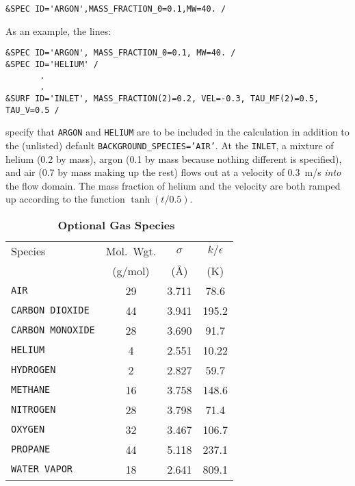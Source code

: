 \documentclass[11pt]{book}
\newcommand{\ct}{\tt\small}
\begin{document}
\footnotesize
\begin{verbatim}
&SPEC ID='ARGON',MASS_FRACTION_0=0.1,MW=40. /
\end{verbatim}
\normalsize



As an example, the lines:

\footnotesize
\begin{verbatim}
&SPEC ID='ARGON', MASS_FRACTION_0=0.1, MW=40. /
&SPEC ID='HELIUM' /
       .
       .
&SURF ID='INLET', MASS_FRACTION(2)=0.2, VEL=-0.3, TAU_MF(2)=0.5, TAU_V=0.5 /
\end{verbatim}
\normalsize
specify that {\ct ARGON} and {\ct HELIUM} are to be included in the calculation
in addition to the (unlisted) default
{\ct BACKGROUND\_SPECIES='AIR'}. At
the {\ct INLET}, a mixture of helium (0.2 by mass), argon (0.1 by mass
because nothing different is specified), and air (0.7 by mass making
up the rest) flows out at a velocity of 0.3~m/s {\em into} the flow
domain. The mass fraction of helium and the velocity are both
ramped up according to the function $\tanh(t/0.5)$.


\begin{table}[t]
\begin{center}
\caption{\bf Optional Gas Species~\cite{Reid:1}}
\label{tab:gasspecies}
\vspace{0.1in}
\begin{tabular}{|l|c|c|c|}
\hline
Species &   Mol.~Wgt.        & $\sigma$  & $k/\epsilon$  \\
        &   (g/mol)          & (\AA)     & (K)            \\ \hline
\hline
{\ct AIR}             & 29   & 3.711     & 78.6           \\ \hline
{\ct CARBON DIOXIDE}  & 44   & 3.941     &195.2           \\ \hline
{\ct CARBON MONOXIDE} & 28   & 3.690     & 91.7           \\ \hline
{\ct HELIUM}          &  4   & 2.551     & 10.22          \\ \hline
{\ct HYDROGEN}        &  2   & 2.827     & 59.7           \\ \hline
{\ct METHANE}         & 16   & 3.758     &148.6           \\ \hline
{\ct NITROGEN}        & 28   & 3.798     & 71.4           \\ \hline
{\ct OXYGEN}          & 32   & 3.467     &106.7           \\ \hline
{\ct PROPANE}         & 44   & 5.118     &237.1           \\ \hline
{\ct WATER VAPOR}     & 18   & 2.641     &809.1           \\ \hline
\end{tabular}
\end{center}
\end{table}
\end{document}
